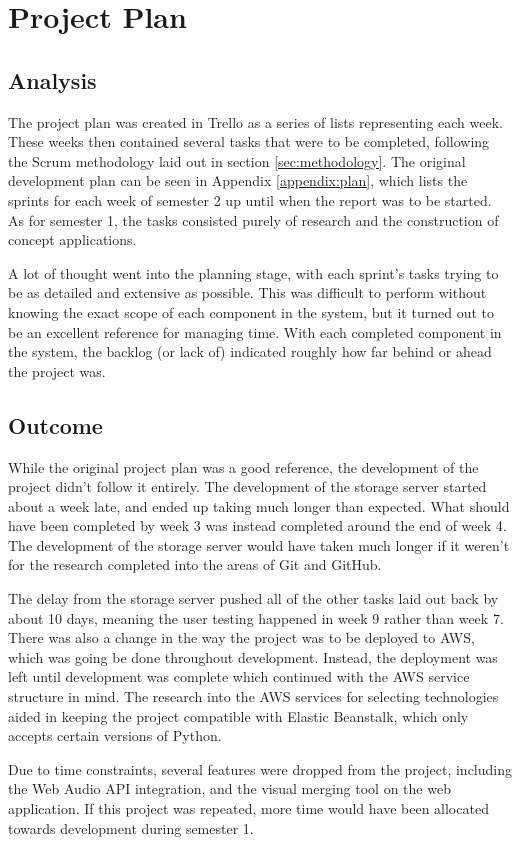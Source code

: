 \chapter{Project Plan}

\section{Analysis}
The project plan was created in Trello as a series of lists representing each week. These weeks then contained several tasks that were to be completed, following the Scrum methodology laid out in section \ref{sec:methodology}. The original development plan can be seen in Appendix \ref{appendix:plan}, which lists the sprints for each week of semester 2 up until when the report was to be started. As for semester 1, the tasks consisted purely of research and the construction of concept applications.

A lot of thought went into the planning stage, with each sprint's tasks trying to be as detailed and extensive as possible. This was difficult to perform without knowing the exact scope of each component in the system, but it turned out to be an excellent reference for managing time. With each completed component in the system, the backlog (or lack of) indicated roughly how far behind or ahead the project was.

\section{Outcome}
While the original project plan was a good reference, the development of the project didn't follow it entirely. The development of the storage server started about a week late, and ended up taking much longer than expected. What should have been completed by week 3 was instead completed around the end of week 4. The development of the storage server would have taken much longer if it weren't for the research completed into the areas of Git and GitHub.

The delay from the storage server pushed all of the other tasks laid out back by about 10 days, meaning the user testing happened in week 9 rather than week 7. There was also a change in the way the project was to be deployed to AWS, which was going be done throughout development. Instead, the deployment was left until development was complete which continued with the AWS service structure in mind. The research into the AWS services for selecting technologies aided in keeping the project compatible with Elastic Beanstalk, which only accepts certain versions of Python.

Due to time constraints, several features were dropped from the project, including the Web Audio API integration, and the visual merging tool on the web application. If this project was repeated, more time would have been allocated towards development during semester 1.
